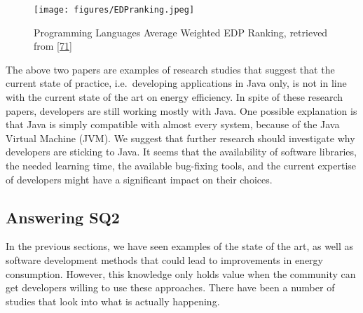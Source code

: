 \documentclass[]{book}
\begin{document}
\begin{figure}
\centering
\texttt{[image: figures/EDPranking.jpeg]}
\caption{Programming Languages Average Weighted EDP Ranking, retrieved
from {[}\protect\hyperlink{ref-GKLS2018}{71}{]}}
\end{figure}

The above two papers are examples of research studies that suggest that
the current state of practice, i.e.~developing applications in Java
only, is not in line with the current state of the art on energy
efficiency. In spite of these research papers, developers are still
working mostly with Java. One possible explanation is that Java is
simply compatible with almost every system, because of the Java Virtual
Machine (JVM). We suggest that further research should investigate why
developers are sticking to Java. It seems that the availability of
software libraries, the needed learning time, the available bug-fixing
tools, and the current expertise of developers might have a significant
impact on their choices.

\subsection{Answering SQ2}\label{answering-sq2}

In the previous sections, we have seen examples of the state of the art,
as well as software development methods that could lead to improvements
in energy consumption. However, this knowledge only holds value when the
community can get developers willing to use these approaches. There have
been a number of studies that look into what is actually happening.
\end{document}

